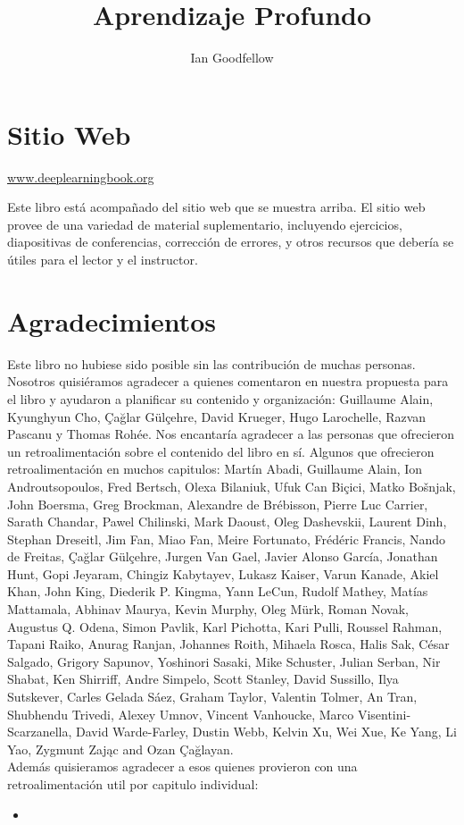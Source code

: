 \documentclass[a4paper,14pt]{book}
\title{Aprendizaje Profundo }
\author{Ian Goodfellow}
\begin{document}
\maketitle
\addtocounter{page}{-1}
\frontmatter
\tableofcontents

\chapter{Sitio Web}
\vspace{5pt}
\begin{center}
    \href{https://www.deeplearningbook.org/}{www.deeplearningbook.org}
\end{center}
\vspace{20pt}
Este libro está acompañado del sitio web que se muestra arriba. El sitio web provee de una variedad de material suplementario, incluyendo ejercicios, diapositivas de conferencias, corrección de errores, y otros recursos que debería se útiles para el lector y el instructor.

\chapter{Agradecimientos}
Este libro no hubiese sido posible sin las contribución de muchas personas. \\
Nosotros quisiéramos agradecer a quienes comentaron en nuestra propuesta para el libro y ayudaron a planificar su contenido y organización: Guillaume Alain, Kyunghyun Cho, Çağlar Gülçehre, David Krueger, Hugo Larochelle, Razvan Pascanu y Thomas
Rohée.
Nos encantaría agradecer a las personas que ofrecieron un retroalimentación sobre el contenido del libro en sí. Algunos que ofrecieron retroalimentación en muchos capitulos: Martín Abadi, Guillaume Alain, Ion Androutsopoulos, Fred Bertsch, Olexa Bilaniuk, Ufuk Can Biçici, Matko Bošnjak, John Boersma, Greg Brockman, Alexandre de Brébisson, Pierre Luc Carrier, Sarath Chandar, Pawel Chilinski, Mark Daoust, Oleg Dashevskii, Laurent Dinh, Stephan Dreseitl, Jim Fan, Miao Fan, Meire Fortunato, Frédéric Francis, Nando de Freitas, Çağlar Gülçehre, Jurgen Van Gael, Javier Alonso García, Jonathan Hunt, Gopi Jeyaram, Chingiz Kabytayev, Lukasz Kaiser, Varun Kanade, Akiel Khan, John King, Diederik P. Kingma, Yann LeCun, Rudolf Mathey, Matías
Mattamala, Abhinav Maurya, Kevin Murphy, Oleg Mürk, Roman Novak, Augustus Q. Odena, Simon Pavlik, Karl Pichotta, Kari Pulli, Roussel Rahman, Tapani Raiko, Anurag Ranjan, Johannes Roith, Mihaela Rosca, Halis Sak, César Salgado, Grigory
Sapunov, Yoshinori Sasaki, Mike Schuster, Julian Serban, Nir Shabat, Ken Shirriff, Andre Simpelo, Scott Stanley, David Sussillo, Ilya Sutskever, Carles Gelada Sáez, Graham Taylor, Valentin Tolmer, An Tran, Shubhendu Trivedi, Alexey Umnov,
Vincent Vanhoucke, Marco Visentini-Scarzanella, David Warde-Farley, Dustin Webb, Kelvin Xu, Wei Xue, Ke Yang, Li Yao, Zygmunt Zając and Ozan Çağlayan.\\
Además quisieramos agradecer a esos quienes provieron con una retroalimentación util por capitulo individual:
\begin{itemize}
    \item 
\end{itemize}



\mainmatter






\end{document}
